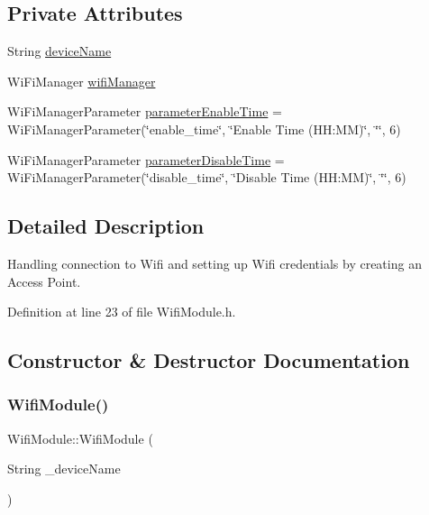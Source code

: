 \subsection*{Private Attributes}
\begin{DoxyCompactItemize}
\item 
String \mbox{\hyperlink{class_wifi_module_a5887fc96e71a65413c0e8645c8947e17}{device\+Name}}
\item 
Wi\+Fi\+Manager \mbox{\hyperlink{class_wifi_module_ad569429d746a3db2fe153e4cf063a07d}{wifi\+Manager}}
\item 
Wi\+Fi\+Manager\+Parameter \mbox{\hyperlink{class_wifi_module_ad138f4478faab934496f1b5679298261}{parameter\+Enable\+Time}} = Wi\+Fi\+Manager\+Parameter(\char`\"{}enable\+\_\+time\char`\"{}, \char`\"{}Enable Time (H\+H\+:\+MM)\char`\"{}, \char`\"{}\char`\"{}, 6)
\item 
Wi\+Fi\+Manager\+Parameter \mbox{\hyperlink{class_wifi_module_a8b457a11d91c9f4a5f88a4087580f8b8}{parameter\+Disable\+Time}} = Wi\+Fi\+Manager\+Parameter(\char`\"{}disable\+\_\+time\char`\"{}, \char`\"{}Disable Time (H\+H\+:\+MM)\char`\"{}, \char`\"{}\char`\"{}, 6)
\end{DoxyCompactItemize}


\subsection{Detailed Description}
Handling connection to Wifi and setting up Wifi credentials by creating an Access Point. 

Definition at line 23 of file Wifi\+Module.\+h.



\subsection{Constructor \& Destructor Documentation}
\mbox{\label{class_wifi_module_a1fad662191ce40056868f0a21d0b1ef0}} 
\subsubsection{\texorpdfstring{WifiModule()}{WifiModule()}}
{\footnotesize\ttfamily Wifi\+Module\+::\+Wifi\+Module (\begin{DoxyParamCaption}\item[{String}]{\+\_\+device\+Name }\end{DoxyParamCaption})}



